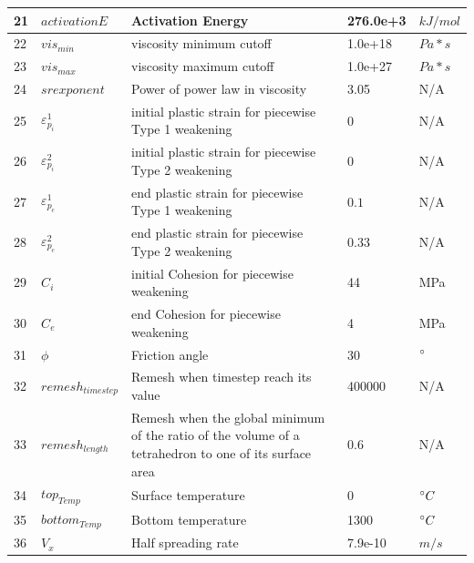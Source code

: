 \begin{table}[h]
\begin{tabular}[h]{l l p{6.8cm} l l}
\hline
21   &  $activationE$    &    Activation Energy      & 276.0e+3   & $kJ/mol$  \\
\hline
22   &  $vis_{min}$    &    viscosity minimum cutoff      & 1.0e+18   & $Pa*s$  \\
\hline
23   &  $vis_{max}$    &    viscosity maximum cutoff      & 1.0e+27   & $Pa*s$  \\
\hline
24   &  $srexponent$    &    Power of power law in viscosity       & 3.05   & N/A  \\
\hline
25   &  $\varepsilon_{p_{i}}^{1}$    &    initial plastic strain for piecewise Type 1 weakening       & $0$   & N/A  \\
\hline
26   &  $\varepsilon_{p_{i}}^{2}$    &    initial plastic strain for piecewise Type 2 weakening       & $0$   & N/A  \\
\hline
27   &  $\varepsilon_{p_{e}}^{1}$    &    end plastic strain for piecewise Type 1 weakening       & $0.1$   & N/A  \\
\hline
28   &  $\varepsilon_{p_{e}}^{2}$    &    end plastic strain for piecewise Type 2 weakening       & $0.33$   & N/A  \\
\hline
29   &  $C_{i}$    &    initial Cohesion for piecewise weakening       & 44   & MPa  \\
\hline
30   &  $C_{e}$    &    end Cohesion for piecewise weakening       & 4   & MPa  \\
\hline
31   &  $\phi$    &    Friction angle      & 30   & $\degree$  \\
\hline
32   &  $remesh_{timestep}$    &    Remesh when timestep reach its value      & 400000   & N/A  \\
\hline
33   &  $remesh_{length}$    &    Remesh when the global minimum of the ratio of the volume of a tetrahedron to one of its surface area      & 0.6   & N/A  \\
\hline
34   &  $top_{Temp}$    &    Surface temperature      & 0   & $\degree C$  \\
\hline
35   &  $bottom_{Temp}$    &    Bottom temperature      & 1300   & $\degree C$  \\
\hline
36   &  $V_{x}$    &    Half spreading rate      & 7.9e-10   & $m/s$  \\

\hline
\hline
\end{tabular}

\label{Tab_ModelParameters}
\end{table}




